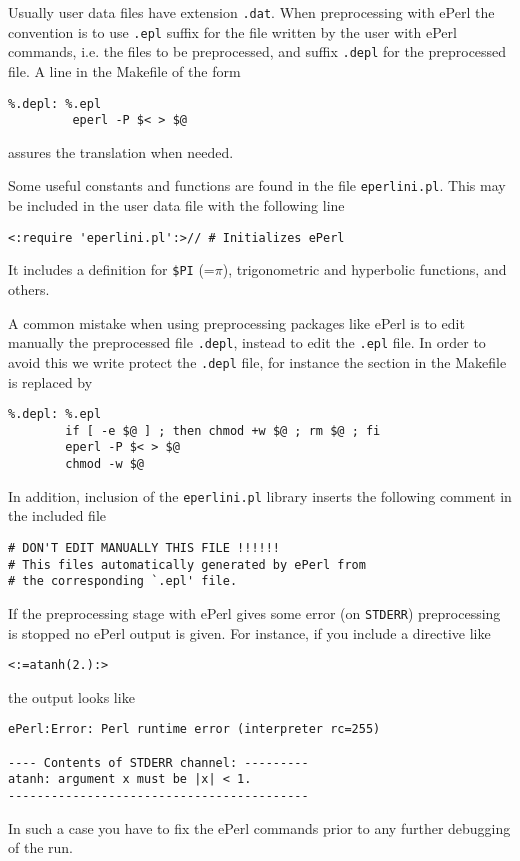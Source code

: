 
%
Usually user data files have extension \verb+.dat+. When preprocessing
with ePerl the convention is to use \verb+.epl+ suffix for the file
written by the user with ePerl commands, i.e. the files to be
preprocessed, and suffix \verb+.depl+ for the preprocessed file. 
A line in the Makefile of the form
%
\begin{verbatim}
%.depl: %.epl
         eperl -P $< > $@
\end{verbatim}
%
assures the translation when needed. 


Some useful constants and functions are found in the file
\verb+eperlini.pl+. This may be included in the user data file with
the following line

\begin{verbatim}
<:require 'eperlini.pl':>// # Initializes ePerl 
\end{verbatim}

It includes a definition for {\tt \$PI} (=$\pi$), trigonometric and
hyperbolic functions, and others. 

A common mistake when using preprocessing packages like ePerl is to
edit manually the preprocessed file \verb+.depl+, instead to edit the 
\verb+.epl+ file. In order to avoid this we write protect the
\verb+.depl+ file, for instance the section in the Makefile is
replaced by 
%
\begin{verbatim}
%.depl: %.epl
        if [ -e $@ ] ; then chmod +w $@ ; rm $@ ; fi
        eperl -P $< > $@
        chmod -w $@
\end{verbatim}
%
In addition, inclusion of the \verb+eperlini.pl+ library inserts the
following comment in the included file
%
\begin{verbatim}
# DON'T EDIT MANUALLY THIS FILE !!!!!!
# This files automatically generated by ePerl from 
# the corresponding `.epl' file. 
\end{verbatim}


If the preprocessing stage with ePerl gives some error (on
\verb+STDERR+) preprocessing is stopped no ePerl output is given. For
instance, if you include a directive like 
%
\begin{verbatim}
<:=atanh(2.):>
\end{verbatim}
%
the output looks like
%
\begin{verbatim}
ePerl:Error: Perl runtime error (interpreter rc=255)

---- Contents of STDERR channel: ---------
atanh: argument x must be |x| < 1.
------------------------------------------
\end{verbatim}
%
In such a case you have to fix the ePerl commands prior to any further
debugging of the \pfem{} run. 

